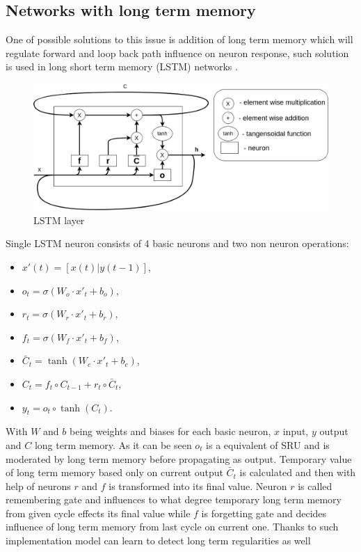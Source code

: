 \subsection{Networks with long term memory}
One of possible solutions to this issue is addition of long term memory which will regulate
forward and loop back path influence on neuron response, such solution is used in long short
term memory (LSTM) networks \cite{Hochreiter1997}.
\begin{figure}[htb] 
	\label{fig:lstm}
	\includegraphics[width=\textwidth]{figures/lstm}
	\caption{LSTM layer}
\end{figure}
Single LSTM neuron consists of 4 basic neurons and two non neuron operations:
\begin{itemize}
\item $x'(t)=[x(t)|y(t-1)]$,
\item $o_t=\sigma (W_o\cdot x'_t+b_o)$,
\item $r_t=\sigma (W_r\cdot x'_t+b_r)$,
\item $f_t=\sigma (W_f\cdot x'_t+b_f)$,
\item $\bar{C}_t=\tanh (W_c\cdot x'_t+b_c)$,
\item $C_t=f_t\circ C_{t-1}+r_t\circ \bar{C}_t$,
\item $y_t=o_t\circ \tanh (C_t)$.
\end{itemize}
With $W$ and $b$ being weights and biases for each basic neuron, $x$ input, $y$ output and
$C$ long term memory. As it can be seen $o_t$ is a equivalent of SRU and is moderated by
long term memory before propagating as output. Temporary value of long term memory based
only on current output $\bar{C}_t$ is calculated and then with help of neurons $r$ and $f$
is transformed into its final value.
Neuron $r$ is called remembering gate and influences to what degree temporary long term
memory from given cycle effects its final value while $f$ is forgetting gate and
decides influence of long term memory from last cycle on current one.
Thanks to such implementation model can learn to detect long term regularities as well
